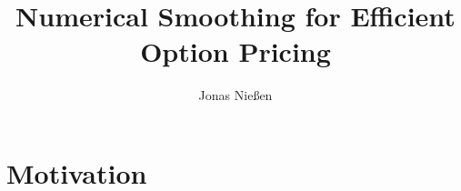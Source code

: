 \documentclass[9pt]{beamer}
\title{Numerical Smoothing for Efficient Option Pricing}
\author{Jonas Nießen} %
\institute[RWTH] %
{
	RWTH Aachen \\ %
}
\date{}
\newcommand{\1}{\mathds{1}}
\begin{document}
	\nocite{*}
	\begin{frame}
		\titlepage %
	\end{frame}
	
	
	\section{Motivation}
	
	
	\appendix
	
	
\end{document}
